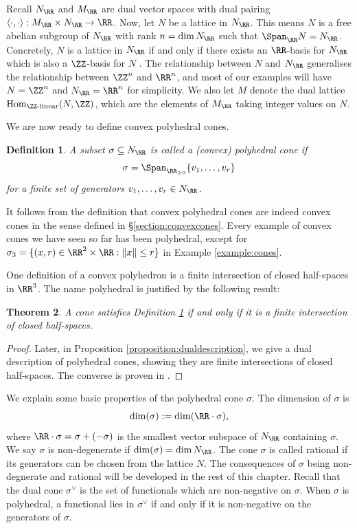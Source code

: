 \documentclass[12pt]{amsart}
\theoremstyle{plain}
\newtheorem{theorem}{Theorem}[subsection]
\newtheorem{definition}[theorem]{Definition}
\begin{document}
Recall $N_\RR$ and $M_\RR$ are dual vector spaces with dual pairing $\langle \cdot , \cdot \rangle : M_\RR \times N_\RR \to \RR$.
Now, let $N$ be a lattice in $N_\RR$.
This means $N$ is a free abelian subgroup of $N_\RR$ with rank $n = \dim N_\RR$ such that $\Span_\RR N = N_\RR$.
Concretely, $N$ is a lattice in $N_\RR$ if and only if there exists an $\RR$-basis for $N_\RR$ which is also a $\ZZ$-basis for $N$ \cite[\S 2.2]{Serre73}.
The relationship between $N$ and $N_\RR$ generalises the relationship between $\ZZ^n$ and $\RR^n$, and most of our examples will have $N = \ZZ^n$ and $N_\RR = \RR^n$ for simplicity.
We also let $M$ denote the dual lattice $\mathrm{Hom}_{\ZZ\text{-linear}}(N, \ZZ)$, which are the elements of $M_\RR$ taking integer values on $N$.

We are now ready to define convex polyhedral cones.

\begin{definition}\label{definition:convexpolyhedral}
A subset $\sigma \subseteq N_\RR$ is called a (convex) polyhedral cone if
$$\sigma = \Span_{\RR_{\ge 0}} \{v_1, \ldots, v_r\}$$
for a finite set of generators $v_1, \ldots, v_r \in N_\RR$.
\end{definition}

It follows from the definition that convex polyhedral cones are indeed convex cones in the sense defined in \S \ref{section:convexcones}.
Every example of convex cones we have seen so far has been polyhedral, except for $\sigma_3 = \{(x, r) \in \RR^2 \times \RR : \|x\| \le r\}$ in Example \ref{example:cones}.

One definition of a convex polyhedron is a finite intersection of closed half-spaces in $\RR^3$.
The name polyhedral is justified by the following result:

\begin{theorem}
A cone satisfies Definition \ref{definition:convexpolyhedral} if and only if it is a finite intersection of closed half-spaces.
\end{theorem}
\begin{proof}
Later, in Proposition \ref{proposition:dualdescription}, we give a dual description of polyhedral cones, showing they are finite intersections of closed half-spaces.
The converse is proven in \cite[1.3.13]{DLHK13}.
\end{proof}

We explain some basic properties of the polyhedral cone $\sigma$.
The dimension of $\sigma$ is
$$\dim(\sigma) := \dim(\RR \cdot \sigma),$$
where $\RR\cdot\sigma = \sigma + (-\sigma)$ is the smallest vector subspace of $N_\RR$ containing $\sigma$.
We say $\sigma$ is non-degenerate if $\dim(\sigma) = \dim N_\RR$.
The cone $\sigma$ is called rational if its generators can be chosen from the lattice $N$.
The consequences of $\sigma$ being non-degnerate and rational will be developed in the rest of this chapter.
Recall that the dual cone $\sigma^\vee$ is the set of functionals which are non-negative on $\sigma$.
When $\sigma$ is polyhedral, a functional lies in $\sigma^\vee$ if and only if it is non-negative on the generators of $\sigma$.
\end{document}
